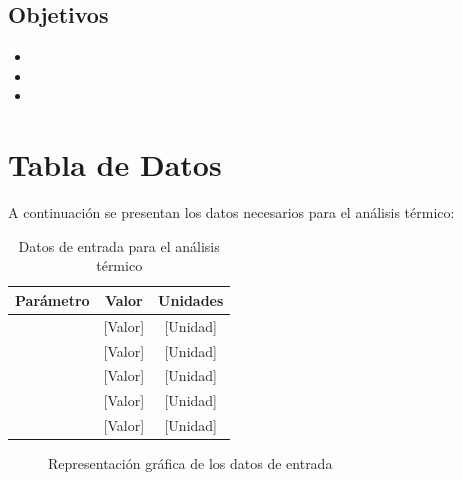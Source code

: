 \documentclass[12pt,letterpaper]{article}
\begin{document}
\subsection{Objetivos}
\begin{itemize}
    \item [Objetivo específico 1]
    \item [Objetivo específico 2]
    \item [Objetivo específico 3]
\end{itemize}

\newpage
\section{Tabla de Datos}

A continuación se presentan los datos necesarios para el análisis térmico:

\begin{table}[H]
    \centering
    \caption{Datos de entrada para el análisis térmico}
    \label{tab:datos_entrada}
    \begin{tabular}{lcc}
        \toprule
        \textbf{Parámetro} & \textbf{Valor} & \textbf{Unidades} \\
        \midrule
        [Parámetro 1] & [Valor] & [Unidad] \\
        [Parámetro 2] & [Valor] & [Unidad] \\
        [Parámetro 3] & [Valor] & [Unidad] \\
        [Parámetro 4] & [Valor] & [Unidad] \\
        [Parámetro 5] & [Valor] & [Unidad] \\
        \bottomrule
    \end{tabular}
\end{table}

\vspace{1cm}
\begin{figure}[H]
    \centering
    \caption{Representación gráfica de los datos de entrada}
    \label{fig:datos_graficos}
\end{figure}

\newpage
\end{document}
